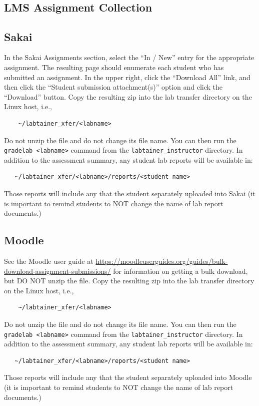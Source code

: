 \documentclass[12pt]{article}
\begin{document}
\begin{appendices}
{}
\setcounter{page}{3}
\section{\\LMS Assignment Collection}
\label{lms collection}
\subsection{Sakai}
In the Sakai Assignments section, select the ``In / New'' entry for the appropriate assignment.
The resulting page should enumerate each student who has submitted an assignment.  In the upper right,
click the ``Download All'' link, and then click the ``Student submission attachment(s)'' option and
click the ``Download'' button.  Copy the resulting zip into the lab transfer directory 
on the Linux host, i.e.,
\begin{verbatim}
    ~/labtainer_xfer/<labname>
\end{verbatim}
\noindent Do not unzip the file and do not change its file name.
You can then run the {\tt gradelab <labname>} command from the {\tt labtainer_instructor} directory.
In addition to the assessment summary, any student lab reports will be available in:
\begin{verbatim}
   ~/labtainer_xfer/<labname>/reports/<student name> 
\end{verbatim}
\noindent Those reports will include any that the student separately uploaded into Sakai (it is 
important to remind students to NOT change the name of lab report documents.)

\subsection{Moodle}
See the Moodle user guide at 
\newline
\url{https://moodleuserguides.org/guides/bulk-download-assignment-submissions/}
for information on getting a bulk download, but DO NOT unzip the file.  Copy the resulting zip into the lab transfer directory 
on the Linux host, i.e.,
\begin{verbatim}
    ~/labtainer_xfer/<labname>
\end{verbatim}
\noindent Do not unzip the file and do not change its file name.
You can then run the {\tt gradelab <labname>} command from the {\tt labtainer_instructor} directory.
In addition to the assessment summary, any student lab reports will be available in:
\begin{verbatim}
   ~/labtainer_xfer/<labname>/reports/<student name> 
\end{verbatim}
\noindent Those reports will include any that the student separately uploaded into Moodle (it is 
important to remind students to NOT change the name of lab report documents.)


\end{appendices}
\end{document}
